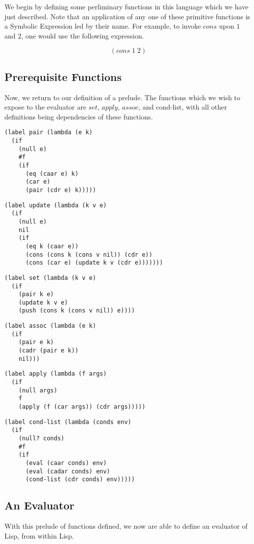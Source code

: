 \documentclass{article}
\begin{document}
We begin by defining some perliminary functions in this language which we have just described. Note that
an application of any one of these primitive functions is a Symbolic Expression led by their name. For
example, to invoke $cons$ upon $1$ and $2$, one would use the following expression.

$$(cons \; 1 \; 2)$$

\subsection{Prerequisite Functions}
Now, we return to our definition of a prelude. The functions which we wish to expose to the evaluator
are $set$, $apply$, $assoc$, and $\text{cond-list}$, with all other definitions being dependencies of these functions.

\begin{verbatim}
(label pair (lambda (e k)
  (if
    (null e)
    #f    
    (if
      (eq (caar e) k)
      (car e)
      (pair (cdr e) k)))))
\end{verbatim}

\begin{verbatim}
(label update (lambda (k v e)
  (if
    (null e)
    nil
    (if
      (eq k (caar e))
      (cons (cons k (cons v nil)) (cdr e))
      (cons (car e) (update k v (cdr e)))))))
\end{verbatim}

\begin{verbatim}
(label set (lambda (k v e)
  (if
    (pair k e)
    (update k v e)
    (push (cons k (cons v nil)) e))))
\end{verbatim}

\begin{verbatim}
(label assoc (lambda (e k)
  (if
    (pair e k)
    (cadr (pair e k))
    nil)))
\end{verbatim}

\begin{verbatim}
(label apply (lambda (f args)
  (if
    (null args)
    f
    (apply (f (car args)) (cdr args)))))
\end{verbatim}

\begin{verbatim}
(label cond-list (lambda (conds env)
  (if
    (null? conds)
    #f
    (if
      (eval (caar conds) env)
      (eval (cadar conds) env)
      (cond-list (cdr conds) env)))))
\end{verbatim}

\subsection{An Evaluator}
With this prelude of functions defined, we now are able to define an evaluator of Lisp, from within 
Lisp.
\end{document}
